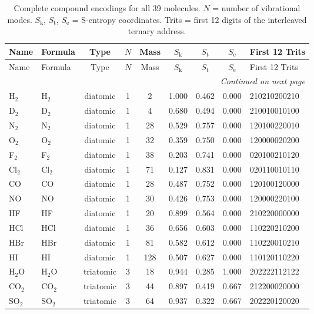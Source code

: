 \documentclass[11pt,twocolumn,a4paper]{article}
\theoremstyle{definition}
\theoremstyle{remark}
\newcommand{\Sk}{S_{\mathrm{k}}}
\newcommand{\St}{S_{\mathrm{t}}}
\newcommand{\Se}{S_{\mathrm{e}}}
\begin{document}
\begin{longtable}{llccccccl}
\caption{Complete compound encodings for all 39 molecules. $N$ = number of vibrational modes. $\Sk$, $\St$, $\Se$ = S-entropy coordinates. Trits = first 12 digits of the interleaved ternary address.}
\label{tab:compounds} \\
\toprule
Name & Formula & Type & $N$ & Mass & $\Sk$ & $\St$ & $\Se$ & First 12 Trits \\
\midrule
\endfirsthead
\toprule
Name & Formula & Type & $N$ & Mass & $\Sk$ & $\St$ & $\Se$ & First 12 Trits \\
\midrule
\endhead
\midrule
\multicolumn{9}{r}{\textit{Continued on next page}} \\
\bottomrule
\endfoot
\bottomrule
\endlastfoot
H$_2$    & H$_2$   & diatomic & 1 & 2   & 1.000 & 0.462 & 0.000 & 210210200210 \\
D$_2$    & D$_2$   & diatomic & 1 & 4   & 0.680 & 0.494 & 0.000 & 210010010100 \\
N$_2$    & N$_2$   & diatomic & 1 & 28  & 0.529 & 0.757 & 0.000 & 120100220010 \\
O$_2$    & O$_2$   & diatomic & 1 & 32  & 0.359 & 0.750 & 0.000 & 120000020200 \\
F$_2$    & F$_2$   & diatomic & 1 & 38  & 0.203 & 0.741 & 0.000 & 020100210120 \\
Cl$_2$   & Cl$_2$  & diatomic & 1 & 71  & 0.127 & 0.831 & 0.000 & 020110010110 \\
CO       & CO      & diatomic & 1 & 28  & 0.487 & 0.752 & 0.000 & 120100120000 \\
NO       & NO      & diatomic & 1 & 30  & 0.426 & 0.753 & 0.000 & 120000220100 \\
HF       & HF      & diatomic & 1 & 20  & 0.899 & 0.564 & 0.000 & 210220000000 \\
HCl      & HCl     & diatomic & 1 & 36  & 0.656 & 0.603 & 0.000 & 110220210200 \\
HBr      & HBr     & diatomic & 1 & 81  & 0.582 & 0.612 & 0.000 & 110220010210 \\
HI       & HI      & diatomic & 1 & 128 & 0.507 & 0.627 & 0.000 & 110120110220 \\
\midrule
H$_2$O   & H$_2$O  & triatomic & 3 & 18  & 0.944 & 0.285 & 1.000 & 202222112122 \\
CO$_2$   & CO$_2$  & triatomic & 3 & 44  & 0.897 & 0.419 & 0.667 & 212200020000 \\
SO$_2$   & SO$_2$  & triatomic & 3 & 64  & 0.937 & 0.322 & 0.667 & 202220120020 \\

\end{longtable}
\end{document}
